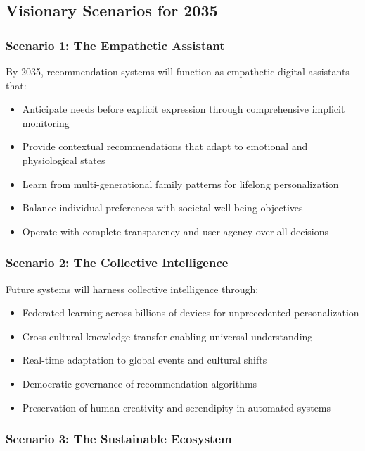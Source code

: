 \documentclass[acmsmall,review,anonymous]{acmart}
\begin{document}
\subsection{Visionary Scenarios for 2035}

\subsubsection{Scenario 1: The Empathetic Assistant}

By 2035, recommendation systems will function as empathetic digital assistants that:
\begin{itemize}
    \item Anticipate needs before explicit expression through comprehensive implicit monitoring
    \item Provide contextual recommendations that adapt to emotional and physiological states
    \item Learn from multi-generational family patterns for lifelong personalization
    \item Balance individual preferences with societal well-being objectives
    \item Operate with complete transparency and user agency over all decisions
\end{itemize}

\subsubsection{Scenario 2: The Collective Intelligence}

Future systems will harness collective intelligence through:
\begin{itemize}
    \item Federated learning across billions of devices for unprecedented personalization
    \item Cross-cultural knowledge transfer enabling universal understanding
    \item Real-time adaptation to global events and cultural shifts
    \item Democratic governance of recommendation algorithms
    \item Preservation of human creativity and serendipity in automated systems
\end{itemize}

\subsubsection{Scenario 3: The Sustainable Ecosystem}
\end{document}
